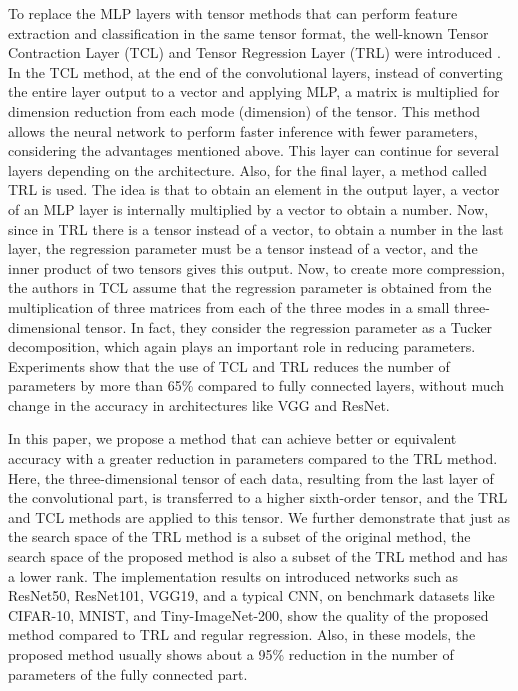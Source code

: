 \documentclass{article}
\begin{document}
To replace the MLP layers with tensor methods that can perform feature extraction and classification in the same tensor format, the well-known Tensor Contraction Layer (TCL) and Tensor Regression Layer (TRL) were introduced \cite{r1}. In the TCL method, at the end of the convolutional layers, instead of converting the entire layer output to a vector and applying MLP, a matrix is multiplied for dimension reduction from each mode (dimension) of the tensor. This method allows the neural network to perform faster inference with fewer parameters, considering the advantages mentioned above. This layer can continue for several layers depending on the architecture. Also, for the final layer, a method called TRL is used. The idea is that to obtain an element in the output layer, a vector of an MLP layer is internally multiplied by a vector to obtain a number. Now, since in TRL there is a tensor instead of a vector, to obtain a number in the last layer, the regression parameter must be a tensor instead of a vector, and the inner product of two tensors gives this output. Now, to create more compression, the authors in TCL assume that the regression parameter is obtained from the multiplication of three matrices from each of the three modes in a small three-dimensional tensor. In fact, they consider the regression parameter as a Tucker decomposition, which again plays an important role in reducing parameters. Experiments show that the use of TCL and TRL reduces the number of parameters by more than 65\% compared to fully connected layers, without much change in the accuracy in architectures like VGG and ResNet.

In this paper, we propose a method that can achieve better or equivalent accuracy with a greater reduction in parameters compared to the TRL method. Here, the three-dimensional tensor of each data, resulting from the last layer of the convolutional part, is transferred to a higher sixth-order tensor, and the TRL and TCL methods are applied to this tensor. We further demonstrate that just as the search space of the TRL method is a subset of the original method, the search space of the proposed method is also a subset of the TRL method and has a lower rank. The implementation results on introduced networks such as ResNet50, ResNet101, VGG19, and a typical CNN, on benchmark datasets like CIFAR-10, MNIST, and Tiny-ImageNet-200, show the quality of the proposed method compared to TRL and regular regression. Also, in these models, the proposed method usually shows about a 95\% reduction in the number of parameters of the fully connected part.
\end{document}
